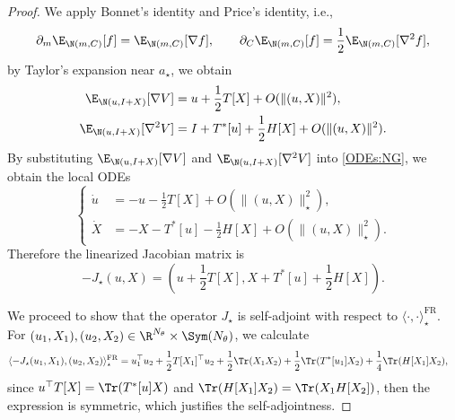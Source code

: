 \begin{proof}
    We apply Bonnet's identity and Price's identity, i.e.,
    \begin{equation*}
        \partial_m \E_{\N (m, C)} [f] = \E_{\N(m, C)} [\nabla f], \qquad \partial_C \E_{\N(m, C)} [f] = \frac{1}{2} \E_{\N(m, C)} [\nabla^2 f],
    \end{equation*}
    by Taylor's expansion near $a_\star$, we obtain
    \begin{align*}
        \E_{\N (u, I + X)} [\nabla V] &= u + \frac{1}{2} T[X] + O (\| (u, X) \|^2), \\
        \E_{\N (u, I + X)} [\nabla^2 V] &= I + T^*[u] + \frac{1}{2} H[X] + O(\|(u, X)\|^2).
    \end{align*}
    By substituting $\E_{\N (u, I + X)} [\nabla V]$ and $\E_{\N (u, I + X)} [\nabla^2 V]$ into \eqref{ODEs:NG}, we obtain the local ODEs
    \begin{equation*}
        \begin{cases}
            \dot u &= -u - \frac{1}{2} T[X] + O(\|(u, X)\|_\star^2), \\
            \dot X &= -X - T^*[u] - \frac{1}{2} H[X] + O(\|(u, X)\|_\star^2).
        \end{cases}
    \end{equation*}
    Therefore the linearized Jacobian matrix is 
    \begin{equation*}
        - J_\star (u, X) = \left( u + \frac{1}{2} T[X], X + T^*[u] + \frac{1}{2} H[X] \right).
    \end{equation*}

    We proceed to show that the operator $J_\star$ is self-adjoint with respect to $\langle \cdot, \cdot \rangle_\star^\mathrm{FR}$. For $(u_1, X_1), (u_2, X_2) \in \R^{N_\theta} \times \Sym (N_\theta)$, we calculate
    \begin{align*}
        \langle -J_\star (u_1, X_1), (u_2, X_2) \rangle_\star^\mathrm{FR} &= u_1^\top u_2 + \frac{1}{2} T[X_1]^\top u_2 + \frac{1}{2} \Tr(X_1 X_2) + \frac{1}{2} \Tr(T^*[u_1] X_2) + \frac{1}{4} \Tr (H[X_1] X_2),
    \end{align*}
    since $u^\top T[X] = \Tr(T^*[u] X)$ and $\Tr(H[X_1] X_2) = \Tr(X_1 H[X_2])$, then the expression is symmetric, which justifies the self-adjointness.


\end{proof}
